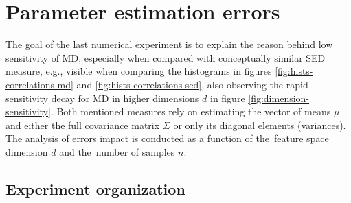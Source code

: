 \section{Parameter estimation errors}
\label{section:estimation-experiment}

The goal of the last numerical experiment is to explain the reason behind low sensitivity of MD, especially when compared with conceptually similar SED measure, e.g., visible when comparing the histograms in figures \ref{fig:hists-correlations-md} and \ref{fig:hists-correlations-sed}, also observing the rapid sensitivity decay for MD in higher dimensions $d$ in figure \ref{fig:dimension-sensitivity}. Both mentioned measures rely on estimating the vector of means $\mu$ and either the full covariance matrix $\Sigma$ or only its diagonal elements (variances). The analysis of errors impact is conducted as a function of the~feature space dimension $d$ and the~number of samples $n$.

\vspace{2.0em}  %


\subsection{Experiment organization}
\label{section:estimation-organization}

